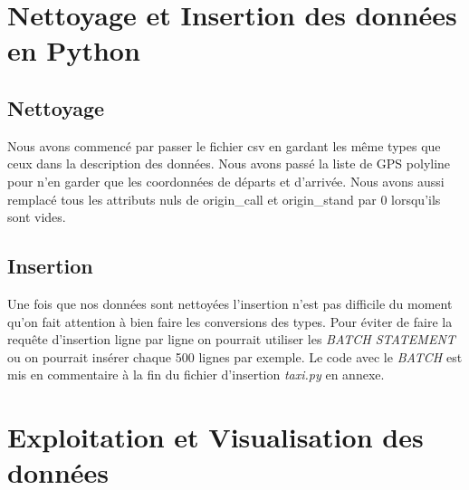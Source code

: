 \documentclass[]{report}
\begin{document}
	
	\section{Nettoyage et Insertion des données en Python}
	\subsection{Nettoyage}
	Nous avons commencé par passer le fichier csv en gardant les même types que ceux dans la description des données.  Nous avons passé la liste de GPS polyline pour n'en garder que les coordonnées de départs et d'arrivée. Nous avons aussi remplacé tous les attributs nuls de origin\_call et origin\_stand par 0 lorsqu'ils sont vides.
	\subsection{Insertion}
	Une fois que nos données sont nettoyées l'insertion n'est pas difficile du moment qu'on fait attention à bien faire les conversions des types. Pour éviter de faire la requête d'insertion ligne par ligne on pourrait utiliser les \textit{BATCH STATEMENT} ou on pourrait insérer chaque 500 lignes par exemple. Le code avec le \textit{BATCH} est mis en commentaire à la fin du fichier d'insertion \textit{taxi.py} en annexe. 
	
	
	\section{Exploitation et Visualisation des données}
\end{document}
